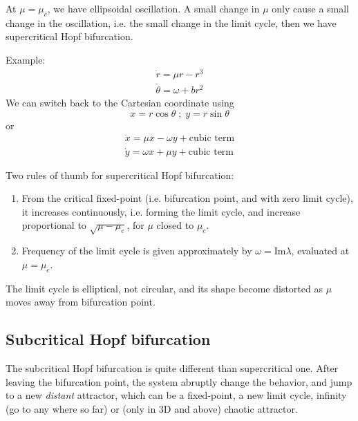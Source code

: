 At $\mu=\mu_c$, we have ellipsoidal oscillation. A small change in
$\mu$ only cause a small change in the oscillation, i.e. the small
change in the limit cycle, then we have supercritical Hopf
bifurcation. 

Example:
\begin{equation}
  \label{eq:673}
  \begin{split}
    \dot{r} = \mu r - r^3 \\
    \dot{\theta} = \omega + br^2
  \end{split}
\end{equation}
We can switch back to the Cartesian coordinate using 
\begin{equation}
  \label{eq:674}
  x=r\cos\theta \; ; \; y = r\sin\theta
\end{equation}
or 
\begin{equation}
  \label{eq:676}
  \begin{split}
    \dot{x} = \mu x - \omega y + \text{cubic term} \\
    \dot{y} = \omega x + \mu y + \text{cubic term}
  \end{split}
\end{equation}


Two rules of thumb for supercritical Hopf bifurcation:
\begin{enumerate}
\item From the critical fixed-point (i.e. bifurcation point, and with
  zero limit cycle), it increases continuously, i.e. forming the limit
  cycle, and increase proportional to $\sqrt{\mu-\mu_c}$, for $\mu$
  closed to $\mu_c$.
\item Frequency of the limit cycle is given approximately by
  $\omega=\text{Im}\lambda$, evaluated at $\mu=\mu_c$.
\end{enumerate}
The limit cycle is elliptical, not circular, and its shape become
distorted as $\mu$ moves away from bifurcation point.

\subsection{Subcritical Hopf bifurcation}
\label{sec:subcr-hopf-bifurc}

The subcritical Hopf bifurcation is quite different than supercritical
one. After leaving the bifurcation point, the system abruptly change
the behavior, and jump to a new {\it distant}  attractor, which can be
a fixed-point, a new limit cycle, infinity (go to any where so far) or
(only in 3D and above) chaotic attractor. 

